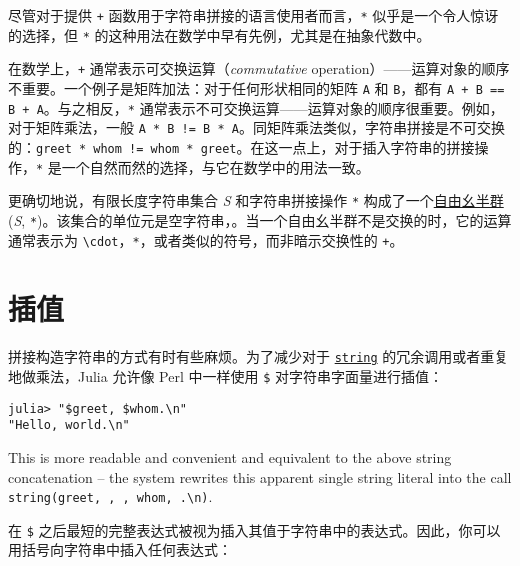 尽管对于提供 \texttt{+} 函数用于字符串拼接的语言使用者而言，\texttt{*} 似乎是一个令人惊讶的选择，但 \texttt{*} 的这种用法在数学中早有先例，尤其是在抽象代数中。



在数学上，\texttt{+} 通常表示可交换运算（\emph{commutative} operation）——运算对象的顺序不重要。一个例子是矩阵加法：对于任何形状相同的矩阵 \texttt{A} 和 \texttt{B}，都有 \texttt{A + B == B + A}。与之相反，\texttt{*} 通常表示不可交换运算——运算对象的顺序很重要。例如，对于矩阵乘法，一般 \texttt{A * B != B * A}。同矩阵乘法类似，字符串拼接是不可交换的：\texttt{greet * whom != whom * greet}。在这一点上，对于插入字符串的拼接操作，\texttt{*} 是一个自然而然的选择，与它在数学中的用法一致。



更确切地说，有限长度字符串集合 \emph{S} 和字符串拼接操作 \texttt{*} 构成了一个\href{https://en.wikipedia.org/wiki/Free\_monoid}{自由幺半群} (\emph{S}, \texttt{*})。该集合的单位元是空字符串，\texttt{{\textquotedbl}{\textquotedbl}}。当一个自由幺半群不是交换的时，它的运算通常表示为 \texttt{{\textbackslash}cdot}，\texttt{*}，或者类似的符号，而非暗示交换性的 \texttt{+}。



\hypertarget{12583298261221600612}{}


\section{插值}



拼接构造字符串的方式有时有些麻烦。为了减少对于 \hyperlink{7919678712989769360}{\texttt{string}} 的冗余调用或者重复地做乘法，Julia 允许像 Perl 中一样使用 \texttt{\$} 对字符串字面量进行插值：




\begin{verbatim}
julia> "$greet, $whom.\n"
"Hello, world.\n"
\end{verbatim}



This is more readable and convenient and equivalent to the above string concatenation – the system rewrites this apparent single string literal into the call \texttt{string(greet, {\textquotedbl}, {\textquotedbl}, whom, {\textquotedbl}.{\textbackslash}n{\textquotedbl})}.



在 \texttt{\$} 之后最短的完整表达式被视为插入其值于字符串中的表达式。因此，你可以用括号向字符串中插入任何表达式：




